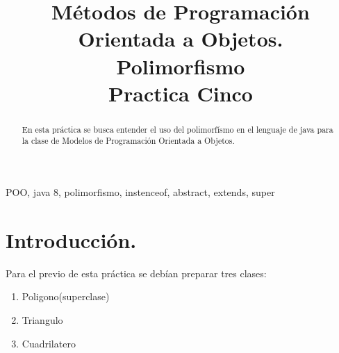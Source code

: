 \documentclass[conference]{IEEEtran}
\begin{document}
    \title{Métodos de  Programación Orientada a Objetos.\\
        Polimorfismo\\
        {\footnotesize Practica Cinco}}
    \author{
        \and
    }\maketitle

    \begin{abstract}
        En esta práctica se busca entender el uso del polimorfísmo en el lenguaje 
        de java para la clase de Modelos de Programación Orientada a Objetos.
    \end{abstract}
    
    \begin{IEEEkeywords}
        POO, java 8, polimorfismo, instenceof, abstract, extends, super
    \end{IEEEkeywords}

    \section{Introducción.}

        Para el previo de esta práctica se debían preparar tres clases:
    
        \begin{enumerate}
            \item Poligono(superclase)
            \item Triangulo
            \item Cuadrilatero
        \end{enumerate}
    
\end{document}
